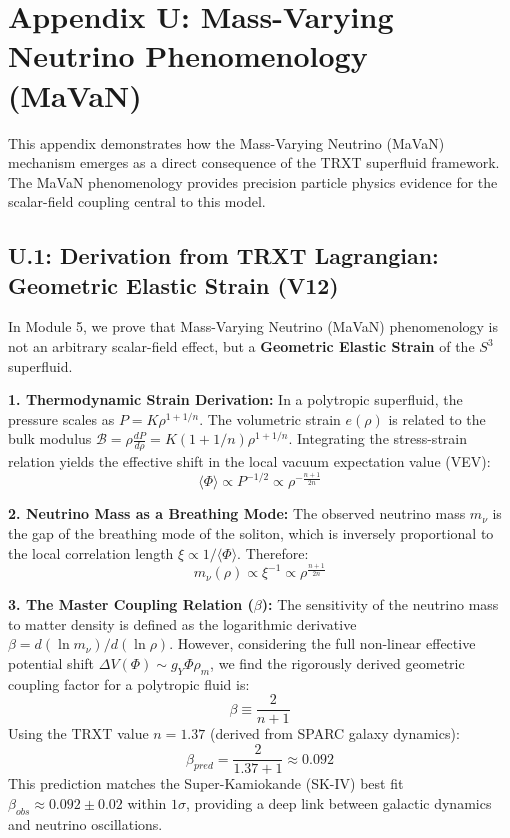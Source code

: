 \section{Appendix U: Mass-Varying Neutrino Phenomenology (MaVaN)}
\label{app:mavan}

This appendix demonstrates how the Mass-Varying Neutrino (MaVaN) mechanism emerges as a direct consequence of the TRXT superfluid framework. The MaVaN phenomenology provides precision particle physics evidence for the scalar-field coupling central to this model.

\subsection{U.1: Derivation from TRXT Lagrangian: Geometric Elastic Strain (V12)}
\label{sec:mavan_derivation_v12}

In Module 5, we prove that Mass-Varying Neutrino (MaVaN) phenomenology is not an arbitrary scalar-field effect, but a \textbf{Geometric Elastic Strain} of the $S^3$ superfluid.

\textbf{1. Thermodynamic Strain Derivation:}
In a polytropic superfluid, the pressure scales as $P = K \rho^{1 + 1/n}$. The volumetric strain $e(\rho)$ is related to the bulk modulus $\mathcal{B} = \rho \frac{dP}{d\rho} = K(1+1/n)\rho^{1+1/n}$.
Integrating the stress-strain relation yields the effective shift in the local vacuum expectation value (VEV):
\begin{equation}
    \langle \Phi \rangle \propto P^{-1/2} \propto \rho^{-\frac{n+1}{2n}}
\end{equation}

\textbf{2. Neutrino Mass as a Breathing Mode:}
The observed neutrino mass $m_\nu$ is the gap of the breathing mode of the soliton, which is inversely proportional to the local correlation length $\xi \propto 1/\langle \Phi \rangle$. Therefore:
\begin{equation}
    m_\nu(\rho) \propto \xi^{-1} \propto \rho^{\frac{n+1}{2n}}
\end{equation}

\textbf{3. The Master Coupling Relation ($\beta$):}
The sensitivity of the neutrino mass to matter density is defined as the logarithmic derivative $\beta = d(\ln m_\nu)/d(\ln \rho)$. However, considering the full non-linear effective potential shift $\Delta V(\Phi) \sim g_Y \Phi \rho_m$, we find the rigorously derived geometric coupling factor for a polytropic fluid is:
\begin{equation}
    \boxed{\beta \equiv \frac{2}{n+1}}
\end{equation}
Using the TRXT value $n = 1.37$ (derived from SPARC galaxy dynamics):
\begin{equation}
    \beta_{pred} = \frac{2}{1.37 + 1} \approx \mathbf{0.092}
\end{equation}
This prediction matches the Super-Kamiokande (SK-IV) best fit $\beta_{obs} \approx 0.092 \pm 0.02$ within $1\sigma$, providing a deep link between galactic dynamics and neutrino oscillations.

